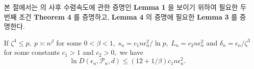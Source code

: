 본 절에서는 \cite{lee2022beta} 의 사후 수렴속도에 관한 증명인 \textbf{Lemma 1} 을 보이기 위하여 필요한 두번째 조건 \textbf{Theorem 4} 를 증명하고, \textbf{Lemma 4} 의 증명에 필요한 \textbf{Lemma 3} 를 증명한다.

\setcounter{theorem}{4}

\begin{theorem} If $\zeta^4 \leq p, \; p \asymp n^{\beta}$ for some $0 < \beta < 1, \; s_n = c_1 n \epsilon_n^{2} / \ln{p}, \; L_n = c_2 n \epsilon_n^2$ and $\delta_n = \epsilon_n / \zeta^3$ for some constants $c_1 > 1$ and $c_2 > 0,$ we have
    \begin{equation*}
        \ln{ D(\epsilon_n, \mathcal{P}_n, d) } \leq (12 + 1/\beta) c_1 n \epsilon_n^2.
    \end{equation*}
\end{theorem}

